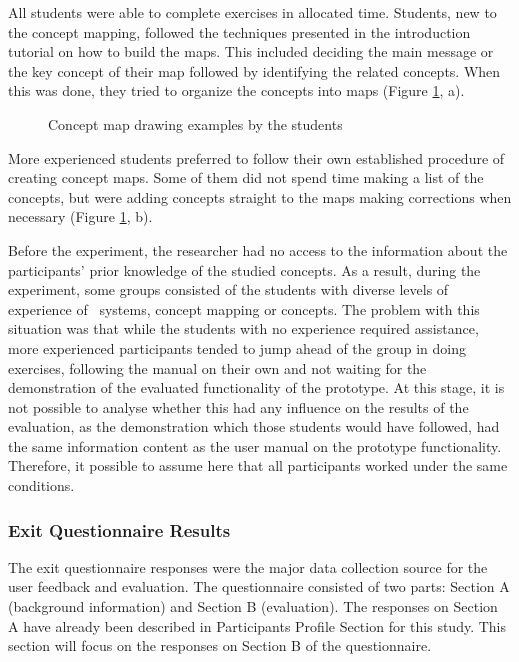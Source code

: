 All students were able to complete exercises in allocated time. Students, new to
the concept mapping, followed the techniques presented in the introduction
tutorial on how to build the maps. This included deciding the main message or
the key concept of their map followed by identifying the related concepts. When
this was done, they tried to organize the concepts into maps (Figure
\ref{fig:study2maps}, a).

\begin{figure}[htb]
\centering
\setlength\fboxsep{0pt}
\setlength\fboxrule{0.5pt}
\subfigure[Example 1]{
\fbox{\texttt{[image: CH7-F12-E2]}}
\label{fig:subfig1}
}
\subfigure[Example 2]{
\fbox{\texttt{[image: CH7-F12-E1]}}
\label{fig:subfig2}
}
\caption{Concept map drawing examples by the students}
\label{fig:study2maps}
\end{figure}
 
More experienced students preferred to follow their own established procedure of
creating concept maps. Some of them did not spend time making a list of the
concepts, but were adding concepts straight to the maps making corrections when
necessary (Figure \ref{fig:study2maps}, b).

Before the experiment, the researcher had no access to the information about
the participants' prior knowledge of the studied concepts. As a result, during
the experiment, some groups consisted of the students with diverse levels of
experience of \ep~systems, concept mapping or \LLLs concepts. The problem with
this situation was that while the students with no experience required
assistance, more experienced participants tended to jump ahead of the group in
doing exercises, following the manual on their own and not waiting for the
demonstration of the evaluated functionality of the prototype. At this stage, it
is not possible to analyse whether this had any influence on the results of the
evaluation, as the demonstration which those students would have followed, had
the same information content as the user manual on the prototype functionality.
Therefore, it possible to assume here that all participants worked under the
same conditions.

\subsubsection{Exit Questionnaire Results}
The exit questionnaire responses were the major data collection source for the
user feedback and evaluation. The questionnaire consisted of two parts: Section
A (background information) and Section B (evaluation). The responses on Section
A have already been described in Participants Profile Section for this study. This
section will focus on the responses on Section B of the questionnaire. 

